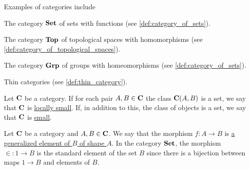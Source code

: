 \begin{example}\label{ex:categories}
  Examples of categories include

  \begin{defenum}
    \item The category $\operatorname{\mathbf{Set}}$ of sets with functions (see \cref{def:category_of_sets}).
    \item The category $\operatorname{\mathbf{Top}}$ of topological spaces with homomorphisms (see \cref{def:category_of_topological_spaces}).
    \item The category $\operatorname{\mathbf{Grp}}$ of groups with homeomorphisms (see \cref{def:category_of_sets}).
    \item Thin categories (see \cref{def:thin_category}).
  \end{defenum}
\end{example}

\begin{definition}\label{def:category_cardinality}
  Let $\operatorname{\mathbf{C}}$ be a category. If for each pair $A, B \in \operatorname{\mathbf{C}}$ the class $\operatorname{\mathbf{C}}(A, B)$ is a set, we say that $\operatorname{\mathbf{C}}$ is \ul{locally small}. If, in addition to this, the class of objects is a set, we say that $\operatorname{\mathbf{C}}$ is \ul{small}.
\end{definition}

\begin{definition}\label{def:generalized_element}\cite[definition 4.1.25]{Leinster2014}
  Let $\operatorname{\mathbf{C}}$ be a category and $A, B \in \operatorname{\mathbf{C}}$. We say that the morphism $f: A \to B$ is \ul{a generalized element of $B$ of shape $A$}. In the category $\operatorname{\mathbf{Set}}$, the morphism $\in : 1 \to B$ is the standard element of the set $B$ since there is a bijection between maps $1 \to B$ and elements of $B$.
\end{definition}

